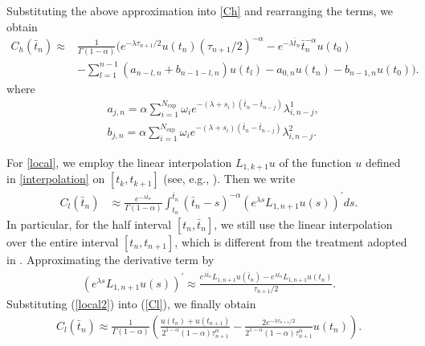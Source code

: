 \documentclass[10pt, reqno]{amsart}
\theoremstyle{remark}
\theoremstyle{definition}
\numberwithin{table}{section}
\begin{document}
Substituting the above approximation into \eqref{Ch} and rearranging the terms, we obtain
\begin{equation}
\begin{aligned}
    C_h(\bar{t}_n) \approx &\frac{1}{\Gamma(1-\alpha)}({e^{-\lambda {\tau_{n+1}}/{2}} u(t_{n})}{({\tau_{n+1}}/{2})^{-\alpha}}-{e^{-\lambda \bar{t}_n}}{\bar{t}_n^{-\alpha}} u(t_0) \\
     &-\sum_{l=1}^{n-1}(a_{n-l, n}+b_{n-1-l, n})u(t_l)-a_{0, n}u(t_{n})-b_{n-1, n}u(t_0)). 
\end{aligned}
\end{equation}
where
\begin{equation}\label{ab}
\begin{aligned}
&a_{j,  n}=\alpha \sum_{i=1}^{N_{\exp }} \omega_i e^{-(\lambda+s_i)(\bar{t}_n-\bar{t}_{n-j})} \lambda_{i,  n-j}^1,  \\
&b_{j,  n}=\alpha \sum_{i=1}^{N_{\exp }} \omega_i e^{-(\lambda+s_i)(\bar{t}_n-\bar{t}_{n-j})} \lambda_{i,  n-j}^2. 
\end{aligned}
\end{equation}

For \eqref{local}, we employ the linear interpolation $L_{1,k+1}u$ of the function $u$ defined in \eqref{interpolation} on $[t_k, t_{k+1}]$ (see, e.g., \cite{cao2020,Liu2018,sun2006,stynes2017,zhou2024}). Then we write
\begin{align} \label{Cl}
C_l(\bar{t}_n) & \approx \frac{e^{-\lambda \bar{t}_n}}{\Gamma(1-\alpha)} \int_{t_{n}}^{\bar{t}_n} (\bar{t}_n-s)^{-\alpha}(e^{\lambda s} L_{1,  n+1} u(s))^{\prime} d s .
\end{align}
In particular, for the half interval $[t_n, \bar{t}_n]$, we still use the linear interpolation over the entire interval $[t_n, t_{n+1}]$, which is different from the treatment adopted in \cite{Liu2018}. Approximating the derivative term by
\begin{align}
    (e^{\lambda s} L_{1,  n+1} u(s))^{\prime}\approx \frac{e^{\lambda \bar{t}_n} L_{1,  n+1} u(\bar{t}_n)-e^{\lambda t_{n}} L_{1,  n+1} u(t_{n})}{{\tau_{n+1}}/{2}}.\label{local2}
\end{align}
Substituting (\ref{local2}) into (\ref{Cl}), we finally obtain
\begin{align}
    C_l(\bar{t}_n) \approx \frac{1}{\Gamma(1-\alpha)}(\frac{u(t_{n})+u(t_{n+1})}{2^{1-\alpha}(1-\alpha)\tau_{n+1}^\alpha} -\frac{2e^{-\lambda {\tau_{n+1}}/{2}}}{2^{1-\alpha}(1-\alpha)\tau_{n+1}^\alpha} u(t_{n})).
\end{align}
\end{document}
